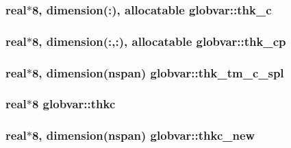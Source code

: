 \subsubsection[{thk\+\_\+c}]{\setlength{\rightskip}{0pt plus 5cm}real$\ast$8, dimension(\+:), allocatable globvar\+::thk\+\_\+c}\label{namespaceglobvar_a82469b82bd578f446472dd30088714f0}
\hypertarget{namespaceglobvar_a621e5e0db93b47d60b4a804c9fe96ac2}{}
\subsubsection[{thk\+\_\+cp}]{\setlength{\rightskip}{0pt plus 5cm}real$\ast$8, dimension(\+:,\+:), allocatable globvar\+::thk\+\_\+cp}\label{namespaceglobvar_a621e5e0db93b47d60b4a804c9fe96ac2}
\hypertarget{namespaceglobvar_ae980d61bc1b36665a6e34c2550f78542}{}
\subsubsection[{thk\+\_\+tm\+\_\+c\+\_\+spl}]{\setlength{\rightskip}{0pt plus 5cm}real$\ast$8, dimension({\bf nspan}) globvar\+::thk\+\_\+tm\+\_\+c\+\_\+spl}\label{namespaceglobvar_ae980d61bc1b36665a6e34c2550f78542}
\hypertarget{namespaceglobvar_a23dd44d4f0c8b5be47685d9c5ee98041}{}
\subsubsection[{thkc}]{\setlength{\rightskip}{0pt plus 5cm}real$\ast$8 globvar\+::thkc}\label{namespaceglobvar_a23dd44d4f0c8b5be47685d9c5ee98041}
\hypertarget{namespaceglobvar_a6e2bc84f532e605dfbeec7244ae6a981}{}
\subsubsection[{thkc\+\_\+new}]{\setlength{\rightskip}{0pt plus 5cm}real$\ast$8, dimension({\bf nspan}) globvar\+::thkc\+\_\+new}\label{namespaceglobvar_a6e2bc84f532e605dfbeec7244ae6a981}
\hypertarget{namespaceglobvar_a96fc48391a183ef7111ef81f05d289a5}{}
